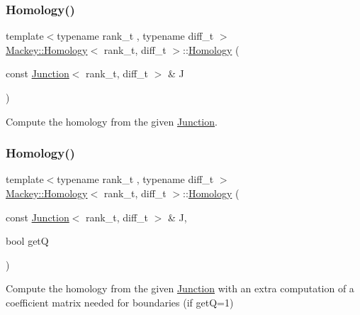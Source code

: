 \mbox{\label{classMackey_1_1Homology_a31e26f0fb8e1cd7f0506ae1dbc97ea22}} 
\subsubsection{\texorpdfstring{Homology()}{Homology()}\hspace{0.1cm}{\footnotesize\ttfamily [2/3]}}
{\footnotesize\ttfamily template$<$typename rank\+\_\+t , typename diff\+\_\+t $>$ \\
\hyperlink{classMackey_1_1Homology}{Mackey\+::\+Homology}$<$ rank\+\_\+t, diff\+\_\+t $>$\+::\hyperlink{classMackey_1_1Homology}{Homology} (\begin{DoxyParamCaption}\item[{const \hyperlink{classMackey_1_1Junction}{Junction}$<$ rank\+\_\+t, diff\+\_\+t $>$ \&}]{J }\end{DoxyParamCaption})}



Compute the homology from the given \hyperlink{classMackey_1_1Junction}{Junction}. 

\mbox{\label{classMackey_1_1Homology_af42f480509ef68df47308c0f506d44c8}} 
\subsubsection{\texorpdfstring{Homology()}{Homology()}\hspace{0.1cm}{\footnotesize\ttfamily [3/3]}}
{\footnotesize\ttfamily template$<$typename rank\+\_\+t , typename diff\+\_\+t $>$ \\
\hyperlink{classMackey_1_1Homology}{Mackey\+::\+Homology}$<$ rank\+\_\+t, diff\+\_\+t $>$\+::\hyperlink{classMackey_1_1Homology}{Homology} (\begin{DoxyParamCaption}\item[{const \hyperlink{classMackey_1_1Junction}{Junction}$<$ rank\+\_\+t, diff\+\_\+t $>$ \&}]{J,  }\item[{bool}]{getQ }\end{DoxyParamCaption})}



Compute the homology from the given \hyperlink{classMackey_1_1Junction}{Junction} with an extra computation of a coefficient matrix needed for boundaries (if getQ=1) 


